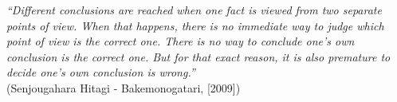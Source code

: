 \begin{epigrafe}
    \vspace*{\fill}
{%
    \noindent\hspace{.5\textwidth}
    {\begin{minipage}{.5\textwidth}
        \textit{``Different conclusions are reached when one fact is viewed from two separate points of view. When that happens, there is no immediate way to judge which point of view is the correct one. There is no way to conclude one’s own conclusion is the correct one. But for that exact reason, it is also premature to decide one’s own conclusion is wrong.''}\\(Senjougahara Hitagi {-} Bakemonogatari, [2009])
    \end{minipage}}%
    \vspace*{3cm}
}%
\end{epigrafe}
